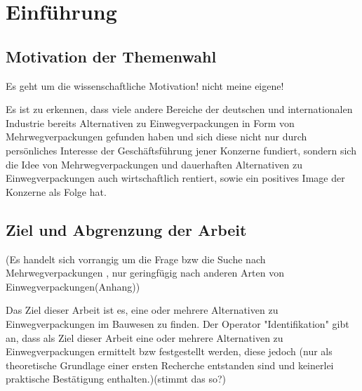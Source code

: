 

\chapter{Einführung}
\label{ch:Einführung}


\section{Motivation der Themenwahl}
\label{sec:Einführung:Motivation der Themenwahl}

Es geht um die wissenschaftliche Motivation! nicht meine eigene! 

Es ist zu erkennen, dass viele andere Bereiche der deutschen und internationalen Industrie bereits Alternativen zu Einwegverpackungen in Form von Mehrwegverpackungen gefunden haben und sich diese nicht nur durch persönliches Interesse der Geschäftsführung jener Konzerne fundiert, sondern sich die Idee von Mehrwegverpackungen und dauerhaften Alternativen zu Einwegverpackungen auch wirtschaftlich rentiert, sowie ein positives Image der Konzerne als Folge hat.







\section{Ziel und Abgrenzung der Arbeit}
\label{sec:Ziel und Abgrenzung}

(Es handelt sich vorrangig um die Frage bzw die Suche nach Mehrwegverpackungen , nur geringfügig nach anderen Arten von Einwegverpackungen(Anhang))
    
Das Ziel dieser Arbeit ist es, eine oder mehrere Alternativen zu Einwegverpackungen im Bauwesen zu finden. Der Operator "Identifikation" gibt an, dass als Ziel dieser Arbeit eine oder mehrere Alternativen zu Einwegverpackungen ermittelt bzw festgestellt werden, diese jedoch (nur als theoretische Grundlage einer ersten Recherche entstanden sind und keinerlei praktische Bestätigung enthalten.)(stimmt das so?)

